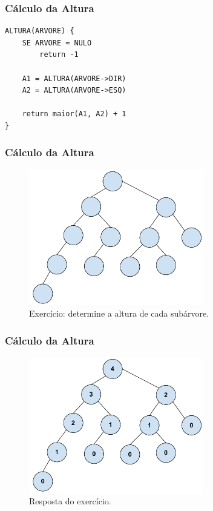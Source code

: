 \begin{frame}[fragile]
\frametitle{Cálculo da Altura}
\begin{verbatim}
ALTURA(ARVORE) {
    SE ARVORE = NULO
        return -1
        
    A1 = ALTURA(ARVORE->DIR)
    A2 = ALTURA(ARVORE->ESQ)
    
    return maior(A1, A2) + 1
}
\end{verbatim}
\end{frame}

\begin{frame}
\frametitle{Cálculo da Altura}

\begin{figure}[tbp]
\includegraphics[keepaspectratio=true,width=3in]{figs/fig_arvores/altura1}
\centering
\caption{Exercício: determine a altura de cada subárvore.}
\end{figure}

\end{frame}

\begin{frame}
\frametitle{Cálculo da Altura}

\begin{figure}[tbp]
\includegraphics[keepaspectratio=true,width=3in]{figs/fig_arvores/altura2}
\centering
\caption{Resposta do exercício.}
\end{figure}

\end{frame}

